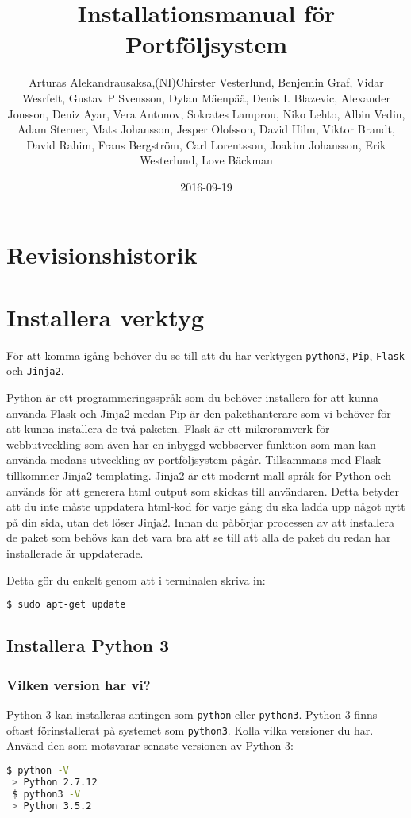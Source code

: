 \documentclass{TDP003mall}
\author{Arturas Alekandrausaksa,(NI)Chirster Vesterlund, Benjemin Graf, Vidar Wesrfelt, Gustav P Svensson, Dylan Mäenpää, Denis I. Blazevic, Alexander Jonsson, Deniz Ayar, Vera Antonov, Sokrates Lamprou, Niko Lehto, Albin Vedin, Adam Sterner, Mats Johansson, Jesper Olofsson, David Hilm, Viktor Brandt, David Rahim, Frans Bergström, Carl Lorentsson, Joakim Johansson, Erik Westerlund, Love Bäckman}
\title{Installationsmanual för Portföljsystem}
\date{2016-09-19}
\begin{document}
\projectpage
\section{Revisionshistorik}


\section{Installera verktyg}
För att komma igång behöver du se till att du har verktygen \verb|python3|, \verb|Pip|, \verb|Flask| och \verb|Jinja2|.


Python är ett programmeringsspråk som du behöver installera för att kunna använda Flask och Jinja2 medan Pip är den pakethanterare som vi behöver för att kunna installera de två paketen. 
Flask är ett mikroramverk för webbutveckling som även har en inbyggd webbserver funktion som man kan använda medans utveckling av portföljsystem pågår. 
Tillsammans med Flask tillkommer Jinja2 templating. Jinja2 är ett modernt mall-språk för Python och används för att generera html output som skickas till användaren. Detta betyder att du inte måste uppdatera html-kod för varje gång du ska ladda upp något nytt på din sida, utan det löser Jinja2. 
Innan du påbörjar processen av att installera de paket som behövs kan det vara bra att se till att alla de paket du redan har installerade är uppdaterade.

Detta gör du enkelt genom att i terminalen skriva in:

\begin{lstlisting}[language=bash]
$ sudo apt-get update
\end{lstlisting}

\subsection{Installera Python 3}
\subsubsection{Vilken version har vi?}
Python 3 kan installeras antingen som \verb|python| eller \verb|python3|.
Python 3 finns oftast förinstallerat på systemet som \verb|python3|. Kolla vilka versioner du har. Använd den som motsvarar senaste versionen av Python 3:

\begin{lstlisting}[language=bash]
 $ python -V
 > Python 2.7.12
 $ python3 -V
 > Python 3.5.2
\end{lstlisting}
\end{document}

